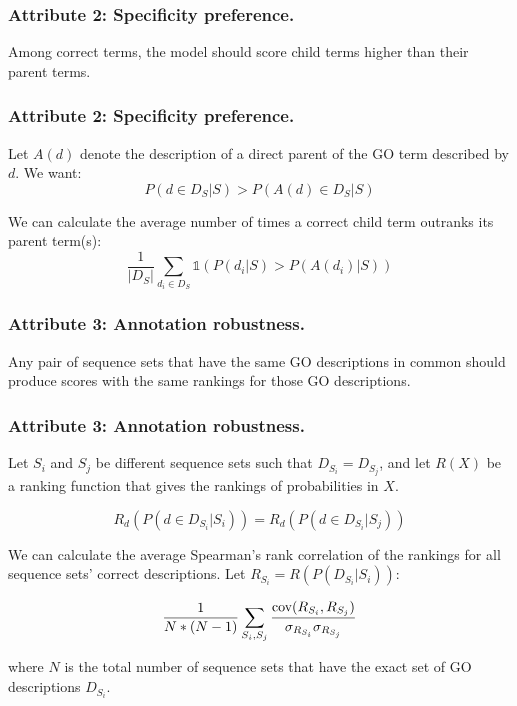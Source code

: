 \documentclass{beamer}
\begin{document}
\begin{frame}
        \frametitle{Attribute 2: Specificity preference.}

        Among correct terms, the model should score child terms higher than their parent terms.
\end{frame}
\begin{frame}
        \frametitle{Attribute 2: Specificity preference.}

Let $A(d)$ denote the description of a direct parent of the GO term described by $d$.\pause
        We want:
        \[P(d \in D_{S}| S) > P(A(d) \in D_{S}| S)\]\pause

        We can calculate the average number of times a correct child term outranks its parent term(s):
        \[\frac{1}{|D_{S}|}\sum_{d_i \in D_{S}} \mathds{1}(P(d_i | S) > P(A(d_i) | S))\]

\end{frame}
\begin{frame}
    \frametitle{Attribute 3: Annotation robustness.}

        Any pair of sequence sets that have the same GO descriptions in common should produce scores with the same rankings for those GO descriptions.
\end{frame}

\begin{frame}
    \frametitle{Attribute 3: Annotation robustness.}
        Let $S_i$ and $S_j$ be different sequence sets such that $D_{S_i} = D_{S_j}$, and let $R(X)$ be a ranking function that gives the rankings of probabilities in $X$.\pause

        \[R_{d}(P(d \in D_{S_i} | S_i)) = R_{d}(P(d \in D_{S_i} | S_j))\]\pause

        We can calculate the average Spearman's rank correlation of the rankings for all sequence sets' correct descriptions.\pause
Let $R_{S_i} = R(P(D_{S_i} | S_i))$:

        \[\frac{1}{N*(N-1)}\sum_{S_i, S_j} \frac{\textnormal{cov}(R_{S_i}, R_{S_j})}{\sigma_{R_{S_i}}\sigma_{R_{S_j}}}\]

        where $N$ is the total number of sequence sets that have the exact set of GO descriptions $D_{S_i}$.

\end{frame}
\end{document}
